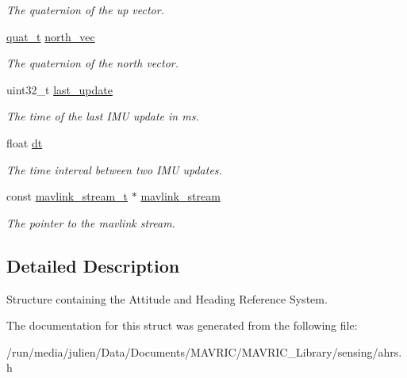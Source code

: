 \begin{DoxyCompactItemize}
\begin{DoxyCompactList}\small\item\em The quaternion of the up vector. \end{DoxyCompactList}\item 
\hypertarget{structahrs__t_af8e95127ee085c52f9186131ebfb3473}{\hyperlink{structquat__t}{quat\+\_\+t} \hyperlink{structahrs__t_af8e95127ee085c52f9186131ebfb3473}{north\+\_\+vec}}\label{structahrs__t_af8e95127ee085c52f9186131ebfb3473}

\begin{DoxyCompactList}\small\item\em The quaternion of the north vector. \end{DoxyCompactList}\item 
\hypertarget{structahrs__t_aa122262b513cbfd29de7a90e9a8175ca}{uint32\+\_\+t \hyperlink{structahrs__t_aa122262b513cbfd29de7a90e9a8175ca}{last\+\_\+update}}\label{structahrs__t_aa122262b513cbfd29de7a90e9a8175ca}

\begin{DoxyCompactList}\small\item\em The time of the last I\+M\+U update in ms. \end{DoxyCompactList}\item 
\hypertarget{structahrs__t_a09ac8b47ce59461e361697668cd7c3b7}{float \hyperlink{structahrs__t_a09ac8b47ce59461e361697668cd7c3b7}{dt}}\label{structahrs__t_a09ac8b47ce59461e361697668cd7c3b7}

\begin{DoxyCompactList}\small\item\em The time interval between two I\+M\+U updates. \end{DoxyCompactList}\item 
\hypertarget{structahrs__t_a30200da4cf07150e408e2b947ec97544}{const \hyperlink{structmavlink__stream__t}{mavlink\+\_\+stream\+\_\+t} $\ast$ \hyperlink{structahrs__t_a30200da4cf07150e408e2b947ec97544}{mavlink\+\_\+stream}}\label{structahrs__t_a30200da4cf07150e408e2b947ec97544}

\begin{DoxyCompactList}\small\item\em The pointer to the mavlink stream. \end{DoxyCompactList}\end{DoxyCompactItemize}


\subsection{Detailed Description}
Structure containing the Attitude and Heading Reference System. 

The documentation for this struct was generated from the following file\+:\begin{DoxyCompactItemize}
\item 
/run/media/julien/\+Data/\+Documents/\+M\+A\+V\+R\+I\+C/\+M\+A\+V\+R\+I\+C\+\_\+\+Library/sensing/ahrs.\+h\end{DoxyCompactItemize}
